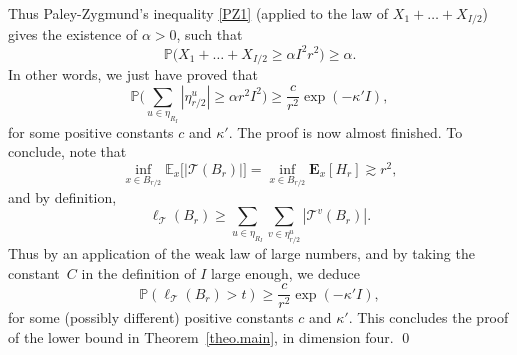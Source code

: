 \documentclass[JEP,XML,SOM,Unicode,NoFloatCountersInSection,published]{cedram}
\let\ts\textstyle
\theoremstyle{plain}
\theoremstyle{definition}
\newcommand\T{\mathcal{T}}
\newcommand{\1}{{\text{\Large $\mathfrak 1$}}}
\begin{document}
Thus Paley-Zygmund's inequality \eqref{PZ1} (applied to the law of $X_1+\dots + X_{I/2}$) gives the existence of $\alpha>0$, such that
\[
\mathbb P\big(X_1+\dots + X_{I/2} \ge \alpha I^2r^2\big) \ge \alpha.
\]
In other words, we just have proved that
\[
\mathbb P\big(\ts\sum_{u\in \eta_{R_I}}
|\eta^u_{r/2}|\ge \alpha r^2 I^2\big)\ge \dfrac{c}{r^2}\exp(-\kappa' I),
\]
for some positive constants $c$ and $\kappa'$. The proof is now almost finished. To conclude, note that
\[
\inf_{x\in B_{r/2}}\mathbb E_x\big[|\mathcal T(B_r)|\big] =
\inf_{x\in B_{r/2}} \mathbf E_x[H_r] \gtrsim r^2,
\]
and by definition,
\[
\ell_{\T}(B_r) \ge \sum_{u \in \eta_{R_I} }
\sum_{v \in \eta^u_{r/2} } |\mathcal T^v(B_r)|.
\]
Thus by an application of the weak law of large numbers, and by taking the constant~$C$ in the definition of $I$ large enough, we deduce
\[
\mathbb P(\ell_{\T}(B_r)>t) \geq \frac{c}{r^2} \exp(- \kappa' I),
\]
for some (possibly different) positive constants $c$ and $\kappa'$. This concludes the proof of the lower bound in Theorem~\ref{theo.main}, in dimension four. \qed

\backmatter


\end{document}
